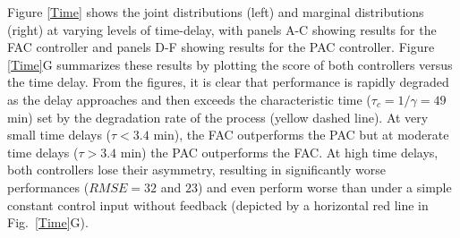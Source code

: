 \documentclass[12pt]{iopart}
\begin{document}
Figure \ref{Time} shows the joint distributions (left) and marginal distributions (right) at varying levels of time-delay, with panels A-C showing results for the FAC controller and panels D-F showing results for the PAC controller. Figure \ref{Time}G summarizes these results by plotting the score of both controllers versus the time delay. From the figures, it is clear that performance is rapidly degraded as the delay approaches and then exceeds the characteristic time ($\tau_c = 1 / \gamma = 49$ min) set by the degradation rate of the process (yellow dashed line). At very small time delays ($\tau< 3.4$ min), the FAC outperforms the PAC  but at moderate time delays ($\tau > 3.4$ min) the PAC outperforms the FAC.
%
At high time delays, both controllers lose their asymmetry, resulting in significantly worse performances ($RMSE = 32$ and $23$) and even perform worse than under a simple constant control input without feedback (depicted by a horizontal red line in Fig.\ \ref{Time}G). 
\end{document}
